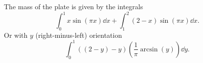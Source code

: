 \documentclass[12pt]{article}
\theoremstyle{plain}
\theoremstyle{definition}
\theoremstyle{remark}
\renewcommand{\:}{\colon}           %
\renewcommand{\.}{\Cdot}                %
\begin{document}
\begin{ptcb}
\begin{center}
\begin{tikzpicture}[x=0.75pt,y=0.75pt,yscale=-1,xscale=1]
  
  \end{tikzpicture}
\end{center}  
The mass of the plate is given by the integrals 
$$\int_{0}^1x\sin(\pi x)\dd x+\int_{1}^2(2-x)\sin(\pi x)\dd x.$$
Or with $y$ (right-minus-left) orientation
$$\int_0^1((2-y)-y)\left(\frac{1}{\pi}\arcsin(y)\right)\dd y.$$

\end{ptcb}

\end{document}
